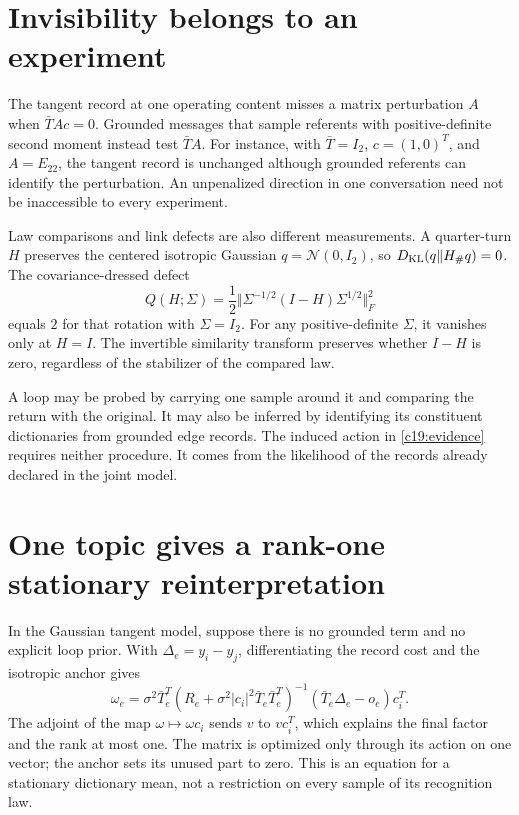 \section{Invisibility belongs to an experiment}

The tangent record at one operating content misses a matrix perturbation $A$ when $\bar TAc=0$. Grounded messages that sample referents with positive-definite second moment instead test $\bar TA$. For instance, with $\bar T=I_2$, $c=(1,0)^T$, and $A=E_{22}$, the tangent record is unchanged although grounded referents can identify the perturbation. An unpenalized direction in one conversation need not be inaccessible to every experiment.

Law comparisons and link defects are also different measurements. A quarter-turn $H$ preserves the centered isotropic Gaussian $q=\mathcal N(0,I_2)$, so $D_{\mathrm{KL}}(q\Vert H_\#q)=0$. The covariance-dressed defect
\begin{equation}
Q(H;\Sigma)=\frac12\Vert\Sigma^{-1/2}(I-H)\Sigma^{1/2}\Vert_F^2
\label{c19:defect}
\end{equation}
equals $2$ for that rotation with $\Sigma=I_2$. For any positive-definite $\Sigma$, it vanishes only at $H=I$. The invertible similarity transform preserves whether $I-H$ is zero, regardless of the stabilizer of the compared law.

A loop may be probed by carrying one sample around it and comparing the return with the original. It may also be inferred by identifying its constituent dictionaries from grounded edge records. The induced action in \cref{c19:evidence} requires neither procedure. It comes from the likelihood of the records already declared in the joint model.

\section{One topic gives a rank-one stationary reinterpretation}

In the Gaussian tangent model, suppose there is no grounded term and no explicit loop prior. With $\Delta_e=y_i-y_j$, differentiating the record cost and the isotropic anchor gives
\begin{equation}
\omega_e=\sigma^2\bar T_e^T
(R_e+\sigma^2|c_i|^2\bar T_e\bar T_e^T)^{-1}
(\bar T_e\Delta_e-o_e)c_i^T.
\label{c19:rank-one}
\end{equation}
The adjoint of the map $\omega\mapsto\omega c_i$ sends $v$ to $vc_i^T$, which explains the final factor and the rank at most one. The matrix is optimized only through its action on one vector; the anchor sets its unused part to zero. This is an equation for a stationary dictionary mean, not a restriction on every sample of its recognition law.

